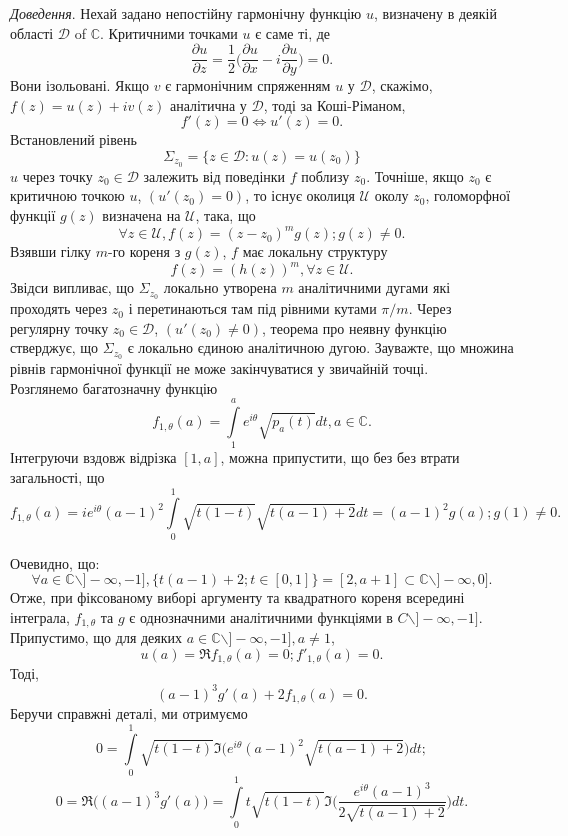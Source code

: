 \documentclass[a4paper]{article}
\newcommand{\dint}{\displaystyle\int}
\begin{document}
\newpage
\noindent
    \textit{Доведення}. Нехай задано непостійну гармонічну функцію $u$, визначену в
    деякій області $\mathcal{D}$ of $\mathbb{C}$. Критичними точками $u$ є саме ті, де
    $$\dfrac{\partial u}{\partial z}=\dfrac{1}{2}\Biggl(\dfrac{\partial u}{\partial x}-i\dfrac{\partial u}{\partial y}\Biggr)=0.$$
    Вони ізольовані. Якщо $v$ є гармонічним спряженням $u$ у $\mathcal{D}$, скажімо, $f(z) =
    u (z) + iv (z)$ аналітична у $\mathcal{D}$, тоді за Коші-Ріманом,
    $$f'(z)=0\Longleftrightarrow u'(z)=0.$$
    Встановлений рівень
    $$\Sigma_{z_0}=\{z\in\mathcal{D}:u(z)=u(z_0)\}$$
    $u$ через точку $z_0 \in \mathcal{D}$ залежить від поведінки $f$ поблизу $z_0$. Точніше, якщо
    $z_0$ є критичною точкою $u$, $(u'(z_0)=0)$, то існує околиця $\mathcal{U}$ околу $z_0$,
    голоморфної функції $g(z)$ визначена на $\mathcal{U}$, така, що
    $$\forall z\in\mathcal{U},f(z)=(z-z_0)^m g(z);g(z)\ne0.$$
    Взявши гілку $m$-го кореня з $g(z)$, $f$ має локальну структуру
    $$f(z)=(h(z))^m,\forall z\in\mathcal{U}.$$
    Звідси випливає, що $\Sigma_{z_0}$ локально утворена $m$ аналітичними дугами які 
    проходять через $z_0$ і перетинаються там під рівними кутами $\pi/m$. Через 
    регулярну точку $z_0 \in \mathcal{D}$, $(u'(z_0)\ne0)$, теорема про неявну функцію стверджує,
    що $\Sigma_{z_0}$ є локально єдиною аналітичною дугою. Зауважте, що множина 
    рівнів гармонічної функції не може закінчуватися у звичайній точці. \\
    
    Розглянемо багатозначну функцію
    $$f_{1,\theta}(a)=\dint\limits_{1}^{a}e^{i\theta}\sqrt{p_a(t)}dt,a\in\mathbb{C}.$$
    Інтегруючи вздовж відрізка $[1, a]$, можна припустити, що без без втрати загальності, що
    \begin{equation}
        f_{1,\theta}(a)=ie^{i\theta}(a-1)^2\dint\limits_{0}^{1}\sqrt{t(1-t)}\sqrt{t(a-1)+2}dt=(a-1)^2g(a); g(1)\ne 0.
    \end{equation}
    
\newpage
\noindent
    Очевидно, що:
    $$\forall a\in\mathbb{C}\backslash]-\infty,-1],\{t(a-1)+2;t\in[0,1]\}=[2,a+1]\subset\mathbb{C}\backslash]-\infty,0].$$
    Отже, при фіксованому виборі аргументу та квадратного кореня всередині
    інтеграла, $f_{1,\theta}$ та $g$ є однозначними аналітичними функціями в $C\backslash]-\infty, -1]$. \\
    
    Припустимо, що для деяких $a \in \mathbb{C}\backslash]-\infty, -1], a\ne1$,
    $$u(a)=\mathfrak{R}f_{1,\theta}(a)=0; f'_{1,\theta}(a)=0.$$
    Тоді,
    $$(a-1)^3g'(a)+2f_{1,\theta}(a)=0.$$
    Беручи справжні деталі, ми отримуємо
    $$0=\dint\limits_{0}^{1}\sqrt{t(1-t)}\Im\Biggl(e^{i\theta}(a-1)^2\sqrt{t(a-1)+2}\Biggr)dt;$$
    $$0=\mathfrak{R}\bigg((a-1)^3g'(a)\bigg)=\dint\limits_{0}^{1}t\sqrt{t(1-t)}\Im\Biggl(\dfrac{e^{i\theta}(a-1)^3}{2\sqrt{t(a-1)+2}}\Biggr)dt.$$
    
\end{document}

